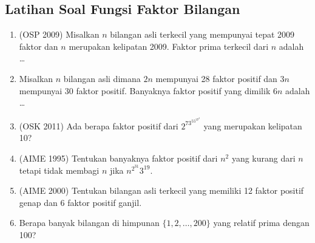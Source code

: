 \subsection{Latihan Soal Fungsi Faktor Bilangan}
\begin{enumerate}
    \item (OSP 2009) Misalkan $n$ bilangan asli terkecil yang mempunyai tepat 2009 faktor dan $n$ merupakan kelipatan 2009. Faktor prima terkecil dari $n$ adalah \dots
    
    \item Misalkan $n$ bilangan asli dimana $2n$ mempunyai 28 faktor positif dan $3n$ mempunyai 30 faktor positif. Banyaknya faktor positif yang dimilik $6n$ adalah \dots
    
    \item (OSK 2011) Ada berapa faktor positif dari $2^73^55^37^2$ yang merupakan kelipatan 10?
    
    \item (AIME 1995) Tentukan banyaknya faktor positif dari $n^2$ yang kurang dari $n$ tetapi tidak membagi $n$ jika $n^{2^{31}}3^{19}.$
    
    \item (AIME 2000) Tentukan bilangan asli terkecil yang memiliki 12 faktor positif genap dan $6$ faktor positif ganjil.

    \item Berapa banyak bilangan di himpunan $\{1,2,\dots,200\}$ yang relatif prima dengan 100?
\end{enumerate}